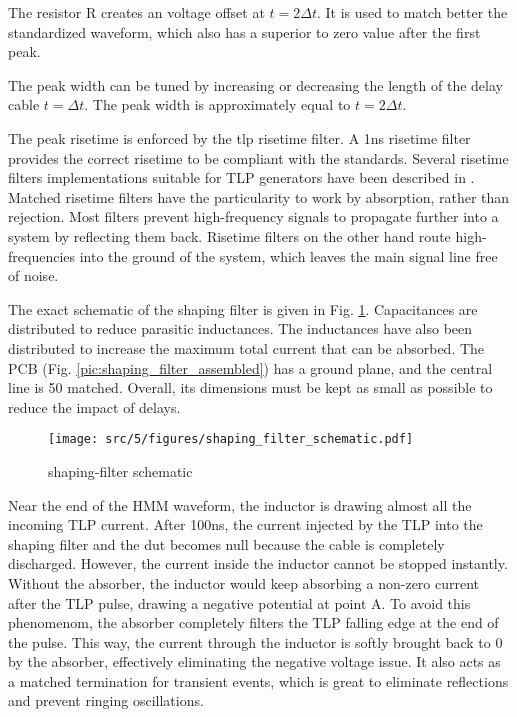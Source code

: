 The resistor R creates an voltage offset at $t=2\Delta t$.
It is used to match better the standardized waveform, which also has a superior to zero value after the first peak.

The peak width can be tuned by increasing or decreasing the length of the delay cable $t=\Delta t$.
The peak width is approximately equal to $t=2\Delta t$.

The peak risetime is enforced by the \gls{tlp} risetime filter.
A 1ns risetime filter provides the correct risetime to be compliant with the standards.
Several risetime filters implementations suitable for TLP generators have been described in \cite{gaussian-lpf,cao-risetime-filter}.
Matched risetime filters have the particularity to work by absorption, rather than rejection.
Most filters prevent high-frequency signals to propagate further into a system by reflecting them back.
Risetime filters on the other hand route high-frequencies into the ground of the system, which leaves the main signal line free of noise.

The exact schematic of the shaping filter is given in Fig. \ref{fig:shaping_filter_schematic}.
Capacitances are distributed to reduce parasitic inductances.
The inductances have also been distributed to increase the maximum total current that can be absorbed.
The PCB (Fig. \ref{pic:shaping_filter_assembled}) has a ground plane, and the central line is 50\textOmega{} matched.
Overall, its dimensions must be kept as small as possible to reduce the impact of delays.

\begin{figure}[!h]
  \centering
  \texttt{[image: src/5/figures/shaping\_filter\_schematic.pdf]}
  \caption{shaping-filter schematic}
  \label{fig:shaping_filter_schematic}
\end{figure}

Near the end of the HMM waveform, the inductor is drawing almost all the incoming \gls{TLP} current.
After 100ns, the current injected by the TLP into the shaping filter and the \gls{dut} becomes null because the cable is completely discharged.
However, the current inside the inductor cannot be stopped instantly.
Without the absorber, the inductor would keep absorbing a non-zero current after the TLP pulse, drawing a negative potential at point A.
To avoid this phenomenom, the absorber completely filters the TLP falling edge at the end of the pulse.
This way, the current through the inductor is softly brought back to 0 by the absorber, effectively eliminating the negative voltage issue.
It also acts as a matched termination for transient events, which is great to eliminate reflections and prevent ringing oscillations.

